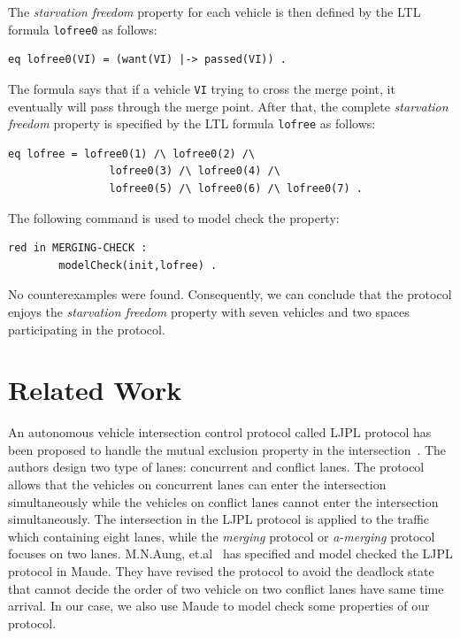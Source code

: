 \documentclass[10pt, conference, compsocconf]{IEEEtran}
\begin{document}
The \textit{starvation freedom} property for each vehicle is then 
defined by the LTL formula \verb!lofree0! as follows:

\begin{small}
\begin{verbatim}
eq lofree0(VI) = (want(VI) |-> passed(VI)) .
\end{verbatim}
\end{small}

\noindent
The formula says that if a vehicle \verb!VI! trying to cross the merge point, 
it eventually will pass through the merge point.
After that, the complete \textit{starvation freedom} property is specified 
by the LTL formula \verb!lofree! as follows:

\begin{small}
\begin{verbatim}
eq lofree = lofree0(1) /\ lofree0(2) /\ 
				lofree0(3) /\ lofree0(4) /\ 
				lofree0(5) /\ lofree0(6) /\ lofree0(7) .
\end{verbatim}
\end{small}

The following command is used to model check the property:
\begin{small}
\begin{verbatim}
red in MERGING-CHECK : 
        modelCheck(init,lofree) .
\end{verbatim}
\end{small}

\noindent
No counterexamples were found. 
Consequently, we can conclude that the protocol enjoys the \textit{starvation freedom} 
property with seven vehicles and two spaces participating in the protocol.
 
\section{Related Work}
 \label{sect_Relate}
 
An autonomous vehicle intersection control protocol called LJPL protocol has 
been proposed to handle the mutual exclusion property in the intersection~\cite{LimJongBeom2018Aedm}.
The authors design two type of lanes: concurrent and conflict lanes. 
The protocol allows that the vehicles on concurrent lanes can enter the 
intersection simultaneously while the vehicles on conflict lanes cannot 
enter the intersection simultaneously.
The intersection in the LJPL protocol is applied to the traffic which 
containing eight lanes, while the \textit{merging} protocol or \textit{a-merging} 
protocol focuses on two lanes.
M.N.Aung, et.al~\cite{DBLP:conf/seke/AungP019} has specified and model 
checked the LJPL protocol in Maude.
They have revised the protocol to avoid the deadlock state that cannot 
decide the order of two vehicle on two conflict lanes have same time arrival.
In our case, we also use Maude to model check some properties of our protocol.
\end{document}
